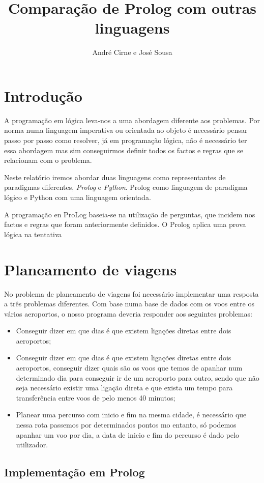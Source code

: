 \documentclass[12pt,a4paper]{report}
\author{André Cirne e José Sousa}
\title{Comparação de Prolog com outras linguagens}
\begin{document}
\maketitle
\tableofcontents
\section{Introdução}
A programação em lógica leva-nos a uma abordagem diferente aos problemas. Por norma numa linguagem imperativa ou orientada ao objeto é necessário pensar passo por passo como resolver, já em programação lógica, não é necessário ter essa abordagem mas sim conseguirmos definir todos os factos e regras que se relacionam com o problema.

Neste relatório iremos abordar duas linguagens como representantes de paradigmas diferentes, \textit{Prolog} e \textit{Python}. Prolog como linguagem de paradigma lógico e Python com uma linguagem orientada.

A programação en ProLog baseia-se na utilização de perguntas, que incidem nos factos e regras que foram anteriormente definidos. O Prolog aplica uma prova lógica na tentativa 
\section{Planeamento de viagens}
No problema de planeamento de viagens foi necessário implementar uma resposta a três problemas diferentes. Com base numa base de dados com os voos entre os vários aeroportos, o nosso programa deveria responder aos seguintes problemas: 
\begin{itemize}
 \item Conseguir dizer em que dias é que existem ligações diretas entre dois aeroportos;
 \item Conseguir dizer em que dias é que existem ligações diretas entre dois aeroportos, conseguir dizer quais são os voos que temos de apanhar num determinado dia para conseguir ir de um aeroporto para outro, sendo que não seja necessário existir uma ligação direta e que exista um tempo para transferência entre voos de pelo menos 40 minutos;
 \item Planear uma percurso com inicio e fim na mesma cidade, é necessário que nessa rota passemos por determinados pontos mo entanto, só podemos apanhar um voo por dia, a data de inicio e fim do percurso é dado pelo utilizador.   
\end{itemize}


\subsection{Implementação em Prolog}
\end{document}
